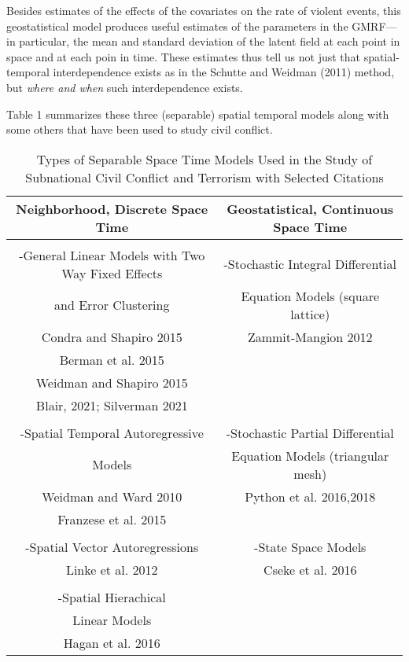 \documentclass[12pt]{article}
\begin{document}
Besides estimates of the effects of the covariates on the rate of violent events, this geostatistical
model produces useful estimates of the parameters in the GMRF---in particular, the mean and
standard deviation of the latent field at each point in space and at each poin in time.
These estimates thus tell us not just that spatial-temporal interdependence exists as
in the Schutte and Weidman (2011) method, but \emph{where and when} such interdependence
exists.


Table 1 summarizes these three (separable) spatial temporal models along with some others
that have been used to study civil conflict.

\begin{table}
\centering
\begin{tabular}{|c|c|}
\hline Neighborhood, Discrete Space Time & Geostatistical, Continuous Space Time\\
\hline
 & \\
-General Linear Models with Two Way Fixed Effects  & -Stochastic Integral Differential\\
and Error Clustering & Equation Models (square lattice)\\
 Condra and Shapiro 2015 & Zammit-Mangion 2012 \\
 Berman et al. 2015 & \\
 Weidman and Shapiro 2015 & \\
 Blair, 2021; Silverman 2021 & \\
  & \\
-Spatial Temporal Autoregressive & -Stochastic Partial Differential\\
Models & Equation Models (triangular mesh) \\
 Weidman and Ward 2010 & Python et al. 2016,2018 \\
 Franzese et al. 2015 & \\
 & \\
-Spatial Vector Autoregressions & -State Space Models \\
Linke et al. 2012 & Cseke et al. 2016\\
 & \\
-Spatial Hierachical & \\
Linear Models & \\
Hagan et al. 2016 & \\
\hline
\end{tabular}
\caption{Types of Separable Space Time Models Used in the Study of Subnational Civil Conflict and Terrorism
with Selected Citations}
\end{table}
\end{document}
